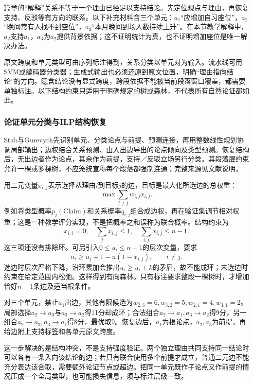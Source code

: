 篇章的“解释”关系不等于一个理由已经足以支持结论。先定位观点与理由，再恢复支持、反驳等有方向的联系。以下补充材料含三个单元：$a_1$“应增加自习座位”，$a_2$“晚间常有人找不到空位”，$a_3$“本月晚间到场人数持续上升”。在本节教学解释中，$a_2$支持$a_1$，$a_3$为$a_2$提供背景依据；这不证明统计为真，也不证明增加座位是唯一解决办法。

原文跨度和单元类型可由序列标注得到，关系分类以单元对为输入。流水线可用SVM或编码器分类器；生成式输出也必须还原到原文位置，明确“理由指向结论”的方向。隐含结论没有显式跨度，跨段依据不能被当前段落窗口覆盖，都需要单独标注。以下结构约束只适用于明确规定的树或森林，不代表所有自然论证都如此。

\subsubsection{论证单元分类与ILP结构恢复}
\label{sec:nlp-analysis-argument-ilp}

Stab与Gurevych先识别单元、分类论点与前提、预测连接，再用整数线性规划协调局部输出；边权结合关系预测、由入出边导出的论点倾向及类型预测。恢复结构后，无出边者作为论点，其余作为前提，支持／反驳立场另行分类。其段落层约束允许一棵或多棵树，不应笼统宣称每个段落都强制连通；完整来源见文献说明。

用二元变量$x_{i,j}$表示选择从理由$i$到目标$j$的边，目标是最大化所选边的总权重：
\[
 \max\sum_{i\ne j}w_{i,j}x_{i,j}.
\]
例如将类型概率$p_j(\mathrm{Claim})$和关系概率$q_{i,j}$组合成边权，再在验证集调节相对权重；这是一种教学评分实现，不是把概率之和误称为联合概率。结构约束为
\[
 x_{i,i}=0,\quad \sum_jx_{i,j}\leq1,\quad
 \sum_{i,j}x_{i,j}\leq n-1.
\]
这三项还没有排除环。可另引入$0\leq u_i\leq n-1$的层次变量，要求
\[
 u_i\geq u_j+1-n(1-x_{i,j}),\qquad i\ne j.
\]
选边时层次严格下降，沿环累加会推出$u_i\geq u_i+k$的矛盾，故不能成环；未选边时约束在给定范围内松弛。这样得到有向森林。只有标注要求整段一棵树时，才增加恰好$n-1$条边及适当根条件。

对三个单元，禁止$a_1$出边，其他有限候选为$w_{2,3}=6,w_{3,2}=5,w_{2,1}=4,w_{3,1}=2$。局部选择$a_2\to a_3$与$a_3\to a_2$得11分却成环；合法组合$a_2\to a_1,a_3\to a_2$得9分，另一组合$a_2\to a_3,a_3\to a_1$得8分，最优取9。恢复边后，$a_1$为根论点，$a_2,a_3$为前提，再给边附上支持标签和各单元原文跨度。

这一步解决的是结构冲突，不是支持强度验证。两个独立理由共同支持同一结论时可以各有一条入向该结论的边；若只有联合使用多个前提才成立，普通二元边不能充分表达该合取，需要额外论证节点或超边。把同一单元既作子论点又作前提的情况压成一个全局类型，也可能损失信息，须与标注层级一致。

